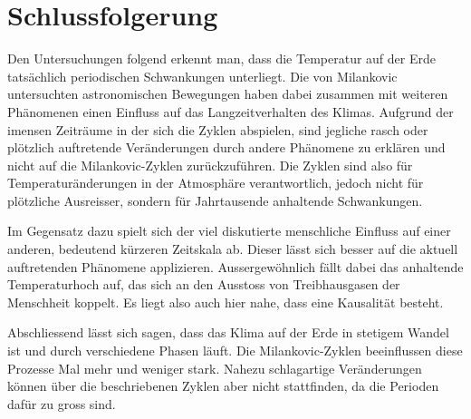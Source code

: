%
%
%
%
\section{Schlussfolgerung
\label{milankovic:section:Schlussfolgerung}}

Den Untersuchungen folgend erkennt man, dass die Temperatur auf der Erde tatsächlich periodischen Schwankungen unterliegt.
Die von Milankovic untersuchten astronomischen Bewegungen haben dabei zusammen mit weiteren Phänomenen einen Einfluss auf das Langzeitverhalten des Klimas.
Aufgrund der imensen Zeiträume in der sich die Zyklen abspielen, sind jegliche rasch oder plötzlich auftretende Veränderungen durch andere Phänomene zu erklären und nicht auf die Milankovic-Zyklen zurückzuführen. 
Die Zyklen sind also für Temperaturänderungen in der Atmosphäre verantwortlich, jedoch nicht für plötzliche Ausreisser, sondern für Jahrtausende anhaltende Schwankungen.

Im Gegensatz dazu spielt sich der viel diskutierte menschliche Einfluss auf einer anderen, bedeutend kürzeren Zeitskala ab.
Dieser lässt sich besser auf die aktuell auftretenden Phänomene applizieren.
Aussergewöhnlich fällt dabei das anhaltende Temperaturhoch auf, das sich an den Ausstoss von Treibhausgasen der Menschheit koppelt.
Es liegt also auch hier nahe, dass eine Kausalität besteht.

Abschliessend lässt sich sagen, dass das Klima auf der Erde in stetigem Wandel ist und durch verschiedene Phasen läuft.
Die Milankovic-Zyklen beeinflussen diese Prozesse Mal mehr und weniger stark.
Nahezu schlagartige Veränderungen können über die beschriebenen Zyklen aber nicht stattfinden, da die Perioden dafür zu gross sind.

